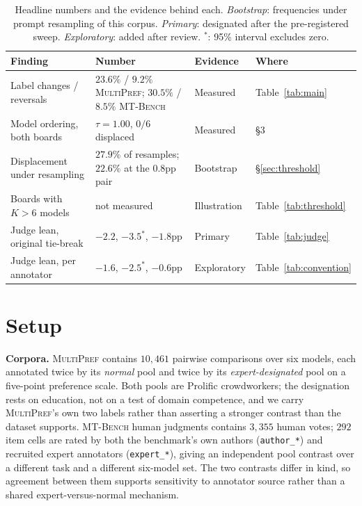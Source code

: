 \documentclass{article}
\begin{document}
\begin{table}[t]
\centering
\small
\caption{Headline numbers and the evidence behind each. \emph{Bootstrap}: frequencies under
prompt resampling of this corpus. \emph{Primary}: designated after the pre-registered sweep.
\emph{Exploratory}: added after review. $^{*}$: 95\% interval excludes zero.}
\label{tab:summary}
\setlength{\tabcolsep}{4pt}
\footnotesize
\begin{tabular}{llll}
\toprule
Finding & Number & Evidence & Where \\
\midrule
Label changes / reversals & $23.6\%$ / $9.2\%$ \textsc{MultiPref}; $30.5\%$ / $8.5\%$ \textsc{MT-Bench} & Measured & Table~\ref{tab:main} \\
Model ordering, both boards & $\tau = 1.00$, $0/6$ displaced & Measured & \S3 \\
Displacement under resampling & $27.9\%$ of resamples; $22.6\%$ at the $0.8$pp pair & Bootstrap & \S\ref{sec:threshold} \\
Boards with $K > 6$ models & not measured & Illustration & Table~\ref{tab:threshold} \\
Judge lean, original tie-break & $-2.2$, $-3.5^{*}$, $-1.8$pp & Primary & Table~\ref{tab:judge} \\
Judge lean, per annotator & $-1.6$, $-2.5^{*}$, $-0.6$pp & Exploratory & Table~\ref{tab:convention} \\
\bottomrule
\end{tabular}
\end{table}

\section{Setup}

\textbf{Corpora.} \textsc{MultiPref} \citep{miranda2024hybrid} contains $10{,}461$
pairwise comparisons over six models, each annotated twice by its \emph{normal} pool and
twice by its \emph{expert-designated} pool on a five-point preference scale. Both pools are
Prolific crowdworkers; the designation rests on education, not on a test of domain
competence, and we carry \textsc{MultiPref}'s own two labels rather than asserting a
stronger contrast than the dataset supports. \textsc{MT-Bench}
human judgments \citep{zheng2023judging} contains $3{,}355$ human votes; $292$
item cells are rated by both the benchmark's own authors (\texttt{author\_*}) and
recruited expert annotators (\texttt{expert\_*}), giving an independent pool
contrast over a different task and a different six-model set. The two contrasts differ in
kind, so agreement between them supports sensitivity to annotator source rather than a
shared expert-versus-normal mechanism.
\end{document}
